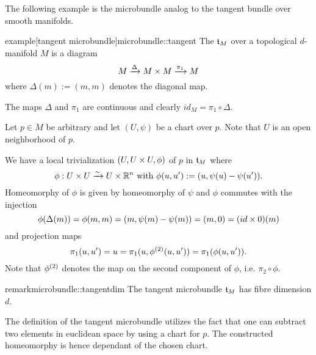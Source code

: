 \begin{myparagraph}
    The following example is the microbundle analog
    to the tangent bundle over smooth manifolds.
\end{myparagraph}

\begin{mystatement}{example}[tangent microbundle]{microbundle::tangent}
    The  $\mathfrak{t}_M$ over a topological $d$-manifold $M$ is a diagram
    \[ M \xrightarrow{\Delta} M \times M \xrightarrow{\pi_1} M{} \]
    where $\Delta(m) := (m, m)$ denotes the diagonal map.
\end{mystatement}

\begin{myproof}
    The maps $\Delta$ and $\pi_1$ are continuous and clearly $id_M = \pi_1 \circ \Delta$.

    Let $p \in M$ be arbitrary and let $(U, \psi)$ be a chart over $p$.
    Note that $U$ is an open neighborhood of $p$.
    
    We have a local trivialization $(U, U \times U, \phi)$ of $p$ in $\mathfrak{t}_M$ where
    \[ \phi: U \times U \xrightarrow{\sim} U \times \mathbb{R}^n \text{ with } \phi(u, u') := (u, \psi(u) - \psi(u')). \]
    Homeomorphy of $\phi$ is given by homeomorphy of $\psi$
    and $\phi$ commutes with the injection
    \[ \phi(\Delta(m)) = \phi(m, m) = (m, \psi(m) - \psi(m)) = (m, 0) = (id \times 0)(m)\]
    and projection maps
    \[ \pi_1(u, u') = u = \pi_1(u, \phi^{(2)}(u, u')) = \pi_1(\phi(u, u')). \]
    Note that $\phi^{(2)}$ denotes the map on the second component of $\phi$,
    i.e. $\pi_2 \circ \phi$.
\end{myproof}

\begin{mystatement}{remark}{microbundle::tangentdim}
    The tangent microbundle $\mathfrak{t}_M$ has fibre dimension $d$.
\end{mystatement}

\begin{myparagraph}
    The definition of the tangent microbundle
    utilizes the fact that one can subtract two elements in euclidean space
    by using a chart for $p$.
    The constructed homeomorphy is hence dependant
    of the chosen chart.
\end{myparagraph}
